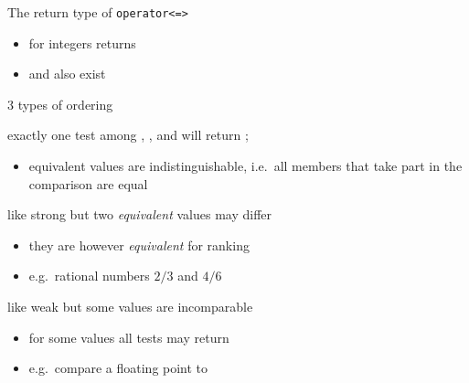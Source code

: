\begin{frame}[fragile]
  \begin{block}{The return type of \texttt{operator<=>}}
    \begin{itemize}
    \item for integers  returns 
    \item {} and  also exist
    \end{itemize}
  \end{block}
  \begin{exampleblock}{3 types of ordering}
    \begin{description}[partial]
    \item[strong] exactly one test among , , and  will return ;
          \begin{itemize}
            \item equivalent values are indistinguishable, i.e.\ all members that take part in the comparison are equal
          \end{itemize}
    \item[weak] like strong but two \emph{equivalent} values may differ
      \begin{itemize}
      \item they are however \emph{equivalent} for ranking
      \item e.g.\ rational numbers $2/3$ and $4/6$
      \end{itemize}
    \item[partial] like weak but some values are incomparable
      \begin{itemize}
      \item for some values all tests may return 
      \item e.g.\ compare a floating point to 
      \end{itemize}
    \end{description}
  \end{exampleblock}
\end{frame}


